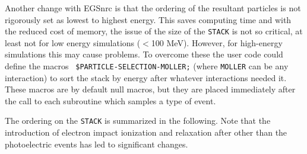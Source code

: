 Another change with EGSnrc is that the ordering of the resultant particles
is not rigorously set as lowest to highest energy.  This saves computing
time and with the reduced cost of memory, the issue of the size of the
{\tt STACK} is not so critical, at least not for low energy simulations ($<$100
MeV).  However, for high-energy simulations this may cause problems. To
overcome these the user code could define the macros {\tt
\$PARTICLE-SELECTION-MOLLER;} (where {\tt MOLLER} can be any interaction)
to sort the stack by energy after whatever interactions needed it. These
macros are by default null macros, but they are placed immediately after
the call to each subroutine which samples a type of event.

The ordering on the {\tt STACK} is summarized in the following.  Note that
the introduction of electron impact ionization and relaxation after other
than the photoelectric events has led to significant changes.
